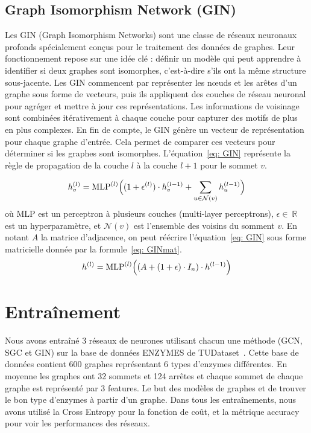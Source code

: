 \documentclass[a4paper]{article}
\begin{document}
\subsection{Graph Isomorphism Network (GIN)}

Les GIN (Graph Isomorphism Networks) sont une classe de réseaux neuronaux profonds spécialement conçus pour le traitement des données
de graphes. Leur fonctionnement repose sur une idée clé : définir un modèle qui peut apprendre à identifier si deux graphes sont 
isomorphes, c'est-à-dire s'ils ont la même structure sous-jacente. Les GIN commencent par représenter les nœuds et les arêtes d'un
graphe sous forme de vecteurs, puis ils appliquent des couches de réseau neuronal pour agréger et mettre à jour ces représentations.
Les informations de voisinage sont combinées itérativement à chaque couche pour capturer des motifs de plus en plus complexes. 
En fin de compte, le GIN génère un vecteur de représentation pour chaque graphe d'entrée. Cela permet de comparer ces vecteurs 
pour déterminer si les graphes sont isomorphes. L'équation~\ref{eq: GIN} représente la règle de
propagation de la couche $l$ à la couche $l+1$ pour le sommet $v$.

\begin{equation}
    h_v^{(l)} = \text{MLP}^{(l)} \Bigl((1+\epsilon^{(l)}) \cdot h_v^{(l-1)}+\sum_{u\in \mathcal{N}(v)}h_u^{(l-1)}\Bigl)
    \label{eq: GIN}
\end{equation}
où $\text{MLP}$ est un perceptron à plusieurs couches (multi-layer perceptrons), $\epsilon \in~\mathbb{R}$ est un hyperparamètre, 
et $\mathcal{N}(v)$ est l'ensemble des voisins du somment $v$. En notant $A$ la matrice d'adjacence, on peut réécrire 
l'équation~\ref{eq: GIN} sous forme matricielle donnée par la formule~\ref{eq: GINmat}.
\begin{equation}
    h^{(l)} = \text{MLP}^{(l)} \Bigl(( A + (1+\epsilon) \cdot I_n)\cdot h^{(l-1)} \Bigl)
    \label{eq: GINmat}
\end{equation}

\section{Entraînement}
Nous avons entraîné 3 réseaux de neurones utilisant chacun une méthode (GCN, SGC et GIN) sur la base de données ENZYMES de 
TUDataset~\cite{Morris+2020}. Cette base de données contient 600 graphes représentant 6 types d'enzymes différentes. En moyenne
les graphes ont 32 sommets et 124 arrêtes et chaque sommet de chaque graphe est représenté par 3 features. Le but des modèles
de graphes et de trouver le bon type d'enzymes à partir d'un graphe. Dans tous les entraînements, nous avons utilisé la Cross
Entropy pour la fonction de coût, et la métrique accuracy pour voir les performances des réseaux.
\end{document}
